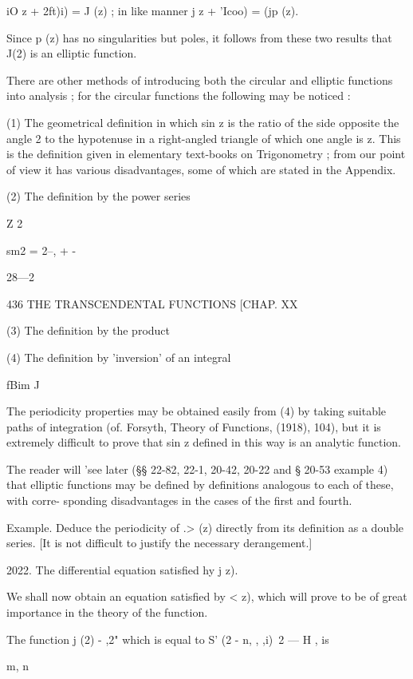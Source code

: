 {iO z + 2ft)i) = J (z) ; in like manner j z + 'Icoo) = (jp (z).

Since p (z) has no singularities but poles, it follows from these two
results that J(2) is an elliptic function.

There are other methods of introducing both the circular and elliptic
functions into analysis ; for the circular functions the following may
be noticed :

(1) The geometrical definition in which sin z is the ratio of the side
opposite the angle 2 to the hypotenuse in a right-angled triangle of
which one angle is z. This is the definition given in elementary
text-books on Trigonometry ; from our point of view it has various
disadvantages, some of which are stated in the Appendix.

(2) The definition by the power series



Z 2

sm2 = 2--, + -



28—2



436 THE TRANSCENDENTAL FUNCTIONS [CHAP. XX

(3) The definition by the product

(4) The definition by 'inversion' of an integral

fBim J

The periodicity properties may be obtained easily from (4) by taking
suitable paths of integration (of. Forsyth, Theory of Functions,
(1918), 104), but it is extremely difficult to prove that sin z
defined in this way is an analytic function.

The reader will 'see later (§§ 22-82, 22-1, 20-42, 20-22 and § 20-53
example 4) that elliptic functions may be defined by definitions
analogous to each of these, with corre- sponding disadvantages in the
cases of the first and fourth.

Example. Deduce the periodicity of .> (z) directly from its definition
as a double series. [It is not difficult to justify the necessary
derangement.]

2022. The differential equation satisfied hy j z).

We shall now obtain an equation satisfied by < z), which will prove to
be of great importance in the theory of the function.

The function j (2) - ,2" which is equal to S' (2 - n, , ,i)~2 — H , is

m, n

}
